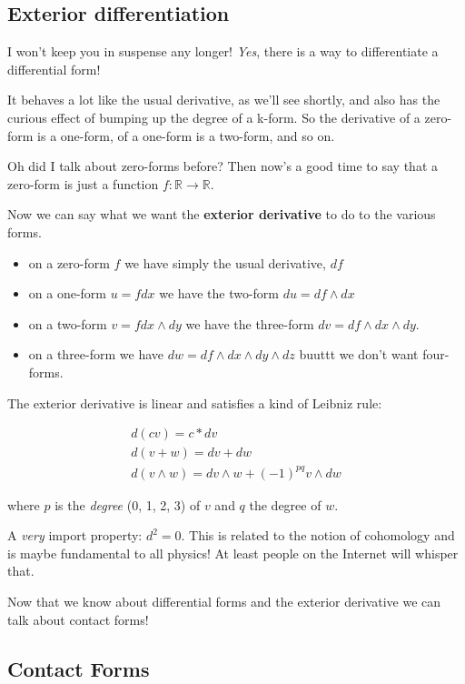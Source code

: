 \documentclass{article}
\begin{document}
\subsection {Exterior differentiation}

I won't keep you in suspense any longer! \textit{Yes}, there is a way to
differentiate a differential form!

It behaves a lot like the usual derivative, as we'll see shortly, and also has
the curious effect of bumping up the degree of a k-form. So the derivative of a
zero-form is a one-form, of a one-form is a two-form, and so on.

Oh did I talk about zero-forms before? Then now's a good time to say that a
zero-form is just a function $f : \mathbb{R} \to \mathbb{R}$.

Now we can say what we want the \textbf{exterior derivative} to do to the
various forms.

\begin{itemize}
  \item on a zero-form $f$ we have simply the usual derivative, $df$
  \item on a one-form $u = f dx$ we have the two-form $du = df \wedge dx$
  \item on a two-form $v = f dx \wedge dy$ we have the three-form $dv = df \wedge dx \wedge
    dy$.
  \item on a three-form we have $dw = df \wedge dx \wedge dy \wedge dz$ buuttt
    we don't want four-forms.
\end{itemize}

The exterior derivative is linear and satisfies a kind of Leibniz rule:

\begin{gather*}
  d(cv) = c * dv \\
  d(v + w) = dv + dw \\
  d(v \wedge w) = dv \wedge w + (-1)^{pq} v \wedge dw
\end{gather*}

where $p$ is the \textit{degree} (0, 1, 2, 3) of $v$ and $q$ the degree of $w$.

A \textit{very} import property: $d^{2} = 0$. This is related to the notion of
cohomology and is maybe fundamental to all physics! At least people on the
Internet will whisper that.

Now that we know about differential forms and the exterior derivative we can
talk about contact forms!

\subsection {Contact Forms}
\end{document}
